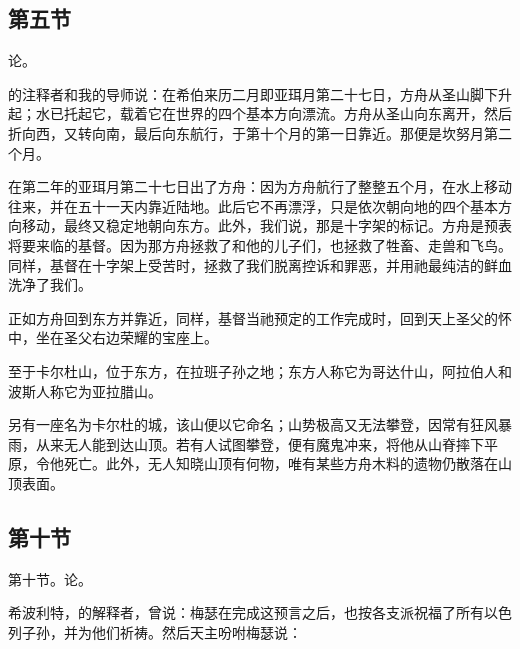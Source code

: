 
\subsection{第五节}

论。\par

的注释者和我的导师说：在希伯来历二月即亚珥月第二十七日，方舟从圣山脚下升起；水已托起它，载着它在世界的四个基本方向漂流。方舟从圣山向东离开，然后折向西，又转向南，最后向东航行，于第十个月的第一日靠近。那便是坎努月第二个月。\par

在第二年的亚珥月第二十七日出了方舟：因为方舟航行了整整五个月，在水上移动往来，并在五十一天内靠近陆地。此后它不再漂浮，只是依次朝向地的四个基本方向移动，最终又稳定地朝向东方。此外，我们说，那是十字架的标记。方舟是预表将要来临的基督。因为那方舟拯救了和他的儿子们，也拯救了牲畜、走兽和飞鸟。同样，基督在十字架上受苦时，拯救了我们脱离控诉和罪恶，并用祂最纯洁的鲜血洗净了我们。\par

正如方舟回到东方并靠近，同样，基督当祂预定的工作完成时，回到天上圣父的怀中，坐在圣父右边荣耀的宝座上。\par

至于卡尔杜山，位于东方，在拉班子孙之地；东方人称它为哥达什山，阿拉伯人和波斯人称它为亚拉腊山。\par

另有一座名为卡尔杜的城，该山便以它命名；山势极高又无法攀登，因常有狂风暴雨，从来无人能到达山顶。若有人试图攀登，便有魔鬼冲来，将他从山脊摔下平原，令他死亡。此外，无人知晓山顶有何物，唯有某些方舟木料的遗物仍散落在山顶表面。\par


\subsection{第十节}

第十节。论。\par

希波利特，的解释者，曾说：梅瑟在完成这预言之后，也按各支派祝福了所有以色列子孙，并为他们祈祷。然后天主吩咐梅瑟说：\par

